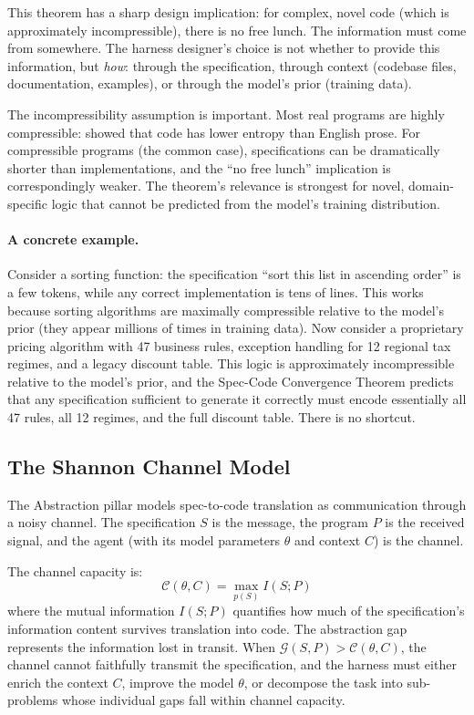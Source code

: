 This theorem has a sharp design implication: for complex, novel code (which is approximately incompressible), there is no free lunch. The information must come from somewhere. The harness designer's choice is not whether to provide this information, but \emph{how}: through the specification, through context (codebase files, documentation, examples), or through the model's prior (training data).

\begin{remark}
The incompressibility assumption is important. Most real programs are highly compressible: \citet{hindle2012naturalness} showed that code has lower entropy than English prose. For compressible programs (the common case), specifications can be dramatically shorter than implementations, and the ``no free lunch'' implication is correspondingly weaker. The theorem's relevance is strongest for novel, domain-specific logic that cannot be predicted from the model's training distribution.
\end{remark}

\paragraph{A concrete example.} Consider a sorting function: the specification ``sort this list in ascending order'' is a few tokens, while any correct implementation is tens of lines. This works because sorting algorithms are maximally compressible relative to the model's prior (they appear millions of times in training data). Now consider a proprietary pricing algorithm with 47 business rules, exception handling for 12 regional tax regimes, and a legacy discount table. This logic is approximately incompressible relative to the model's prior, and the Spec-Code Convergence Theorem predicts that any specification sufficient to generate it correctly must encode essentially all 47 rules, all 12 regimes, and the full discount table. There is no shortcut.

\subsection{The Shannon Channel Model}

The Abstraction pillar models spec-to-code translation as communication through a noisy channel. The specification $S$ is the message, the program $P$ is the received signal, and the agent (with its model parameters $\theta$ and context $C$) is the channel.

The channel capacity is:
\begin{equation}
    \mathcal{C}(\theta, C) = \max_{p(S)} I(S; P)
\end{equation}
where the mutual information $I(S; P)$ quantifies how much of the specification's information content survives translation into code. The abstraction gap represents the information lost in transit. When $\mathcal{G}(S, P) > \mathcal{C}(\theta, C)$, the channel cannot faithfully transmit the specification, and the harness must either enrich the context $C$, improve the model $\theta$, or decompose the task into sub-problems whose individual gaps fall within channel capacity.


